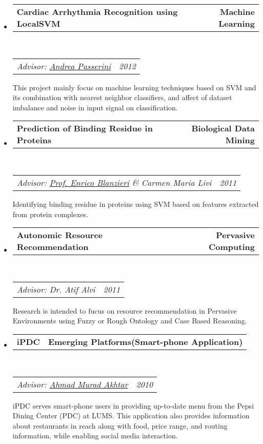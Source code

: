 \documentclass[10pt,letterpaper]{article}
\makeatletter
\newcommand{\headerrow}[2]
{\begin{tabular*}{\linewidth}{l@{\extracolsep{\fill}}r}
	#1 &
	#2 \\
\end{tabular*}}
\makeatother
\begin{document}
\begin{itemize}
	\parskip=0.1em

	\item
	\headerrow
		{\textbf{Cardiac Arrhythmia Recognition using LocalSVM}}
		{\textbf{Machine Learning}}
	\\
	\headerrow
		{\emph{Advisor: \href{http://disi.unitn.it/~passerini/}{Andrea Passerini}}}
		{\emph{2012}}
	\begin{itemize*}
		This project mainly focus on machine learning techniques based on SVM and its combination with nearest neighbor classifiers, and affect of dataset imbalance and noise in input signal on classification.
	\end{itemize*}

	\item
	\headerrow
		{\textbf{Prediction of Binding Residue in Proteins}}
		{\textbf{Biological Data Mining}}
	\\
	\headerrow
		{\emph{Advisor: \href{http://disi.unitn.it/~blanzier/}{Prof. Enrico Blanzieri} \&  Carmen Maria Livi}}
		{\emph{2011}}
	\begin{itemize*}
		Identifying binding residue in proteins using SVM based on features extracted from protein complexes.
	\end{itemize*}

	\item
	\headerrow
		{\textbf{Autonomic Resource Recommendation}}
		{\textbf{Pervasive Computing}}
	\\
	\headerrow
		{\emph{Advisor: Dr. Atif Alvi}}
		{\emph{2011}}
	\begin{itemize*}
		Research is intended to fucus on resource recommendation in Pervasive Environments using Fuzzy or Rough Ontology and Case Based Reasoning.
	\end{itemize*}

	\item
	\headerrow
		{\textbf{iPDC}}
		{\textbf{Emerging Platforms(Smart-phone Application)}}
	\\     %
	\headerrow
		{\emph{Advisor: \href{mailto:murad@tintash.com}{Ahmad Murad Akhtar}}}
		{\emph{2010}}
	\begin{itemize*}
		iPDC serves smart-phone users in providing up-to-date menu from the Pepsi Dining Center (PDC) at LUMS. This application also provides information about restaurants in reach along with food, price range, and routing information, while enabling social media interaction.
	\end{itemize*}


\end{itemize}
\end{document}
